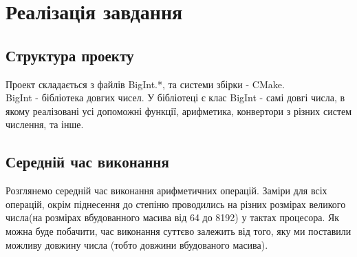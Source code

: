 \documentclass{article}
\begin{document}
\section{Реалізація завдання}

\subsection{Структура проекту}

Проект складається з файлів BigInt.*, та системи збірки - CMake. \\
BigInt - бібліотека довгих чисел.
У бібліотеці є клас BigInt - самі довгі числа, в якому реалізовані усі допоможні функції, арифметика,
конвертори з різних систем числення, та інше.

\subsection{Середній час виконання}
Розглянемо середній час виконання арифметичних операцій. Заміри для всіх операцій, окрім піднесення до степіню проводились на різних розмірах великого числа(на розмірах вбудованного масива від 64 до 8192) у тактах процесора. Як можна буде побачити, час виконання суттєво залежить від того, яку ми поставили можливу довжину числа (тобто довжини вбудованого масива).
\end{document}

